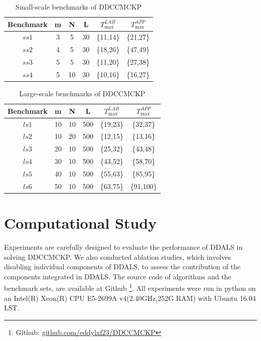 \documentclass[lettersize,journal]{IEEEtran}
\begin{document}
\begin{table}[htpb]
\centering
\caption{Small-scale benchmarks of DDCCMCKP}
\begin{tabular}{cccccc}
\toprule
\bfseries Benchmark & m & N & L & $T_{\max}^{LAB}$ & $T_{\max}^{APP}$\\
\midrule
{\bfseries $ss1$} &3 &5 &30 &\{11,14\} &\{21,27\}\\
{\bfseries $ss2$} &4 &5 &30 &\{18,26\} &\{47,49\}\\
{\bfseries $ss3$} &5 &5 &30 &\{11,20\} &\{27,38\}\\
{\bfseries $ss4$} &5 &10 &30 &\{10,16\} &\{16,27\}\\
\bottomrule
\end{tabular}
\label{benchmark: ss}
\end{table}

\begin{table}[htpb]
\centering
\caption{Large-scale benchmarks of DDCCMCKP}
\begin{tabular}{cccccc}
\toprule
\bfseries Benchmark & m & N & L & $T_{\max}^{LAB}$& $T_{\max}^{APP}$\\
\midrule
{\bfseries $ls1$} &10 &10 &500 &\{19,23\} &\{32,37\}\\
{\bfseries $ls2$} &10 &20 &500 &\{12,15\} &\{13,16\}\\
{\bfseries $ls3$} &20 &10 &500 &\{25,32\} &\{43,48\}\\
{\bfseries $ls4$} &30 &10 &500 &\{43,52\} &\{58,70\}\\
{\bfseries $ls5$} &40 &10 &500 &\{55,63\} &\{85,95\}\\
{\bfseries $ls6$} &50 &10 &500 &\{63,75\} &\{91,100\}\\
\bottomrule
\end{tabular}
\label{benchmark: ls}
\end{table}

\section{Computational Study}
\label{section:cs}
Experiments are carefully designed to evaluate the performance of DDALS in solving DDCCMCKP. 
We also conducted ablation studies, which involves disabling individual components of DDALS, to assess the contribution of the components integrated in DDALS.  
The source code of algorithms and the benchmark sets, are available at Github \footnote{Github: \href{https://github.com/eddylxf23/DDCCMCKP}{github.com/eddylxf23/DDCCMCKP}}. 
All experiments were run in python on an Intel(R) Xeon(R) CPU E5-2699A v4(2.40GHz,252G RAM) with Ubuntu 16.04 LST. 
\end{document}
